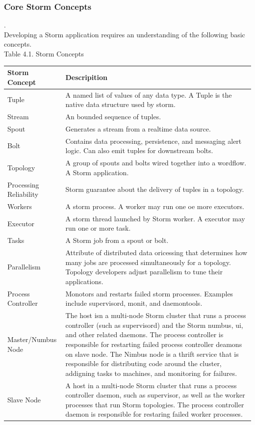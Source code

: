 \documentclass{hcmutarticle}
\begin{document}
\subsubsection{Core Storm Concepts}.\\
Developing a Storm application requires an understanding of the
following basic concepts.\\
Table 4.1. Storm Concepts

\begin{center}
\begin{tabular} {| l | p{10cm} |}
	\hline
		\textbf{Storm Concept} & \textbf{Descripition}\\
	\hline
		Tuple & A named list of values of any data type. A Tuple is the
native data structure used by storm.\\
	\hline
		Stream & An bounded sequence of tuples.\\
	\hline
		Spout & Generates a stream from a realtime data source.\\
	\hline
		Bolt & Contains data processing, persistence, and messaging
alert logic.
		Can also emit tuples for downstream bolts.\\
	\hline
	Topology & A group of spouts and bolts wired together into a
wordflow.
	A Storm application.\\
	\hline
	Processing Reliability & Storm guarantee about the delivery of
tuples in a topology.\\
	\hline
	Workers & A storm process. A worker may run one oe more
executors.\\
	\hline
	Executor & A storm thread launched by Storm worker.
A executor may run one or more task.\\
	\hline
		Tasks & A Storm job from a spout or bolt.\\
\hline
Parallelism & Attribute of distributed data oricessing that determines how many jobs are processed simultaneously for a topology.
Topology developers adjust parallelism to tune their applications.\\
\hline
Process Controller & Monotors and restarts failed storm processes. Examples include supervisord, monit, and daemontools.\\
\hline
Master/Numbus Node & The host isn a multi-node Storm cluster that runs a process controller (such as supervisord) and the Storm numbus, ui, and other related daemons. The process controller is responsible for restarting failed process controller deamons on slave node. The Nimbus node is a thrift service that is responsible for distributing code around the cluster, addigning tasks to machines, and monitoring for failures.\\
\hline
Slave Node & A host in a multi-node Storm cluster that runs a process controller daemon, such as supervisor, as well as the worker processes that run Storm topologies. The process controller daemon is responsible for restaring failed worker processes.\\
\hline
\end{tabular}
\end{center}
\end{document}
